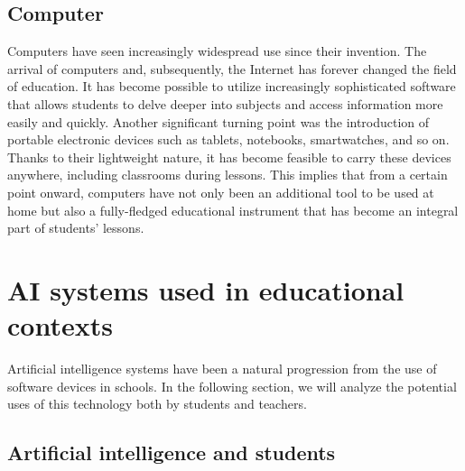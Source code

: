 \documentclass[a4paper,12pt]{article}
\begin{document}
\subsection{Computer}
Computers have seen increasingly widespread use since their invention. The arrival of computers and, subsequently, the Internet has forever changed the field of education. 
It has become possible to utilize increasingly sophisticated software that allows students to delve deeper into subjects and access information more easily and quickly.
Another significant turning point was the introduction of portable electronic devices such as tablets, notebooks, smartwatches, and so on. 
Thanks to their lightweight nature, it has become feasible to carry these devices anywhere, including classrooms during lessons.
This implies that from a certain point onward, computers have not only been an additional tool to be used at home but also a fully-fledged educational instrument that has become an integral part of students' lessons.
\begin{comment}
    I computer hanno avuto un uso sempre maggiore dalla loro invenzione. 
    La venuta prima dei computer e poi di Internet ha per sempre cambiato il mondo dell'insegnamento. è stato possibile ustilizzare software sempre più elaborati che permettono allo studente un maggiore approfondimento ed una maggiore facilità nel reperire l'informazione in tempo breve.
    Un altro grande punto di svolta è stato l'introduzione dei dispositivi eletrronici portatili come: tablet, notebook, smartwatch, etc.
    Data l'estrema leggerezza di questi dipositivi è statopossibile portarli ovunque quindi anche in classe durante le lezioni.
    Questo implica il fatto che da un certo punto in poi i computer non sono stati soltanto uno strumento in più da utilizzare a casa ma anche uno strumento didattico a tutti gli effetti che sono entrati a far parte delle lezioni dello studente.
\end{comment}


\section{AI systems used in educational contexts}
Artificial intelligence systems have been a natural progression from the use of software devices in schools. In the following section, we will analyze the potential uses of this technology both by students and teachers.
\begin{comment}
    I sistemi di Intellgenza artificiale sono stati il naturale sviluppo dell'utillo di dispositivi software nella scuola. Nella sezione seguente saranno analiizati i possibili usi di questa tecnologia sia da parte dello studente che da parte dell'insegnante.
\end{comment}

\subsection{Artificial intelligence and students}

\newpage    %
\end{document}
